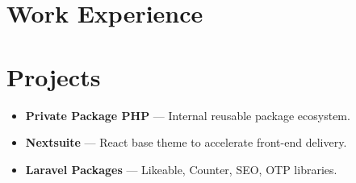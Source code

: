 \documentclass[11pt,a4paper]{article}
\begin{document}

\section*{Work Experience}

\section*{Projects}
\begin{itemize}
  \item \textbf{Private Package PHP} --- Internal reusable package ecosystem.
  \item \textbf{Nextsuite} --- React base theme to accelerate front-end delivery.
  \item \textbf{Laravel Packages} --- Likeable, Counter, SEO, OTP libraries.
\end{itemize}

\end{document}
